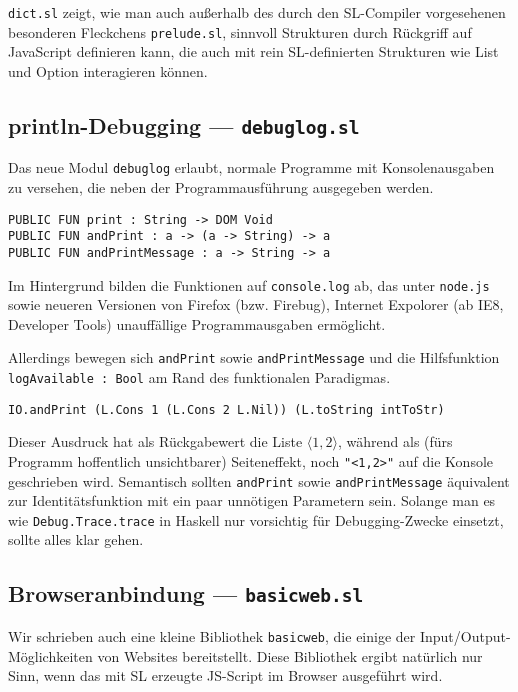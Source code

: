 \documentclass[runningheads]{llncs}
\begin{document}
\verb|dict.sl| zeigt, wie man auch außerhalb des durch den SL-Compiler
vorgesehenen besonderen Fleckchens \verb|prelude.sl|, sinnvoll Strukturen
durch Rückgriff auf JavaScript definieren kann, die auch mit rein
SL-definierten Strukturen wie List und Option interagieren können.

\subsection{println-Debugging --- \texttt{debuglog.sl}}

Das neue Modul \verb|debuglog| erlaubt, normale Programme mit Konsolenausgaben
zu versehen, die neben der Programmausführung ausgegeben werden.

\begin{verbatim}
PUBLIC FUN print : String -> DOM Void
PUBLIC FUN andPrint : a -> (a -> String) -> a
PUBLIC FUN andPrintMessage : a -> String -> a
\end{verbatim}

Im Hintergrund bilden die Funktionen auf \verb|console.log| ab, das unter
\texttt{node.js} sowie neueren Versionen von Firefox (bzw. Firebug), Internet Expolorer
(ab IE8, Developer Tools) unauffällige Programmausgaben ermöglicht.

Allerdings bewegen sich \verb|andPrint| sowie \verb|andPrintMessage| und die
Hilfsfunktion \verb|logAvailable : Bool| am Rand des funktionalen Paradigmas.

\begin{verbatim}
IO.andPrint (L.Cons 1 (L.Cons 2 L.Nil)) (L.toString intToStr)
\end{verbatim}

Dieser Ausdruck hat als Rückgabewert die Liste $\langle1,2\rangle$,
während als (fürs Programm hoffentlich unsichtbarer) Seiteneffekt,
noch \verb|"<1,2>"| auf die Konsole geschrieben wird. Semantisch sollten
\verb|andPrint| sowie \verb|andPrintMessage| äquivalent zur Identitätsfunktion
mit ein paar unnötigen Parametern sein. Solange man es wie
\verb|Debug.Trace.trace| in Haskell nur vorsichtig für Debugging-Zwecke
einsetzt, sollte alles klar gehen.

\subsection{Browseranbindung --- \texttt{basicweb.sl}}

Wir schrieben auch eine kleine Bibliothek \verb|basicweb|, die einige der
Input/Output-Möglichkeiten von Websites bereitstellt. Diese Bibliothek ergibt
natürlich nur Sinn, wenn das mit SL erzeugte JS-Script im Browser ausgeführt
wird.
\end{document}
